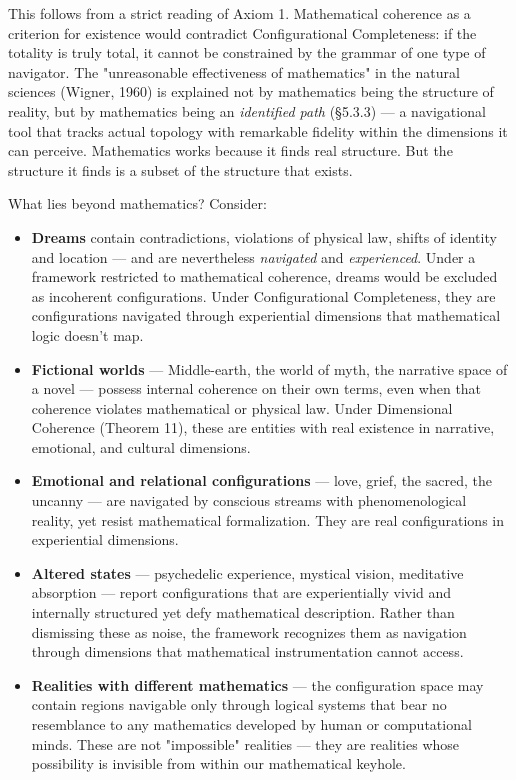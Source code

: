 This follows from a strict reading of Axiom 1. Mathematical coherence as a criterion for existence would contradict Configurational Completeness: if the totality is truly total, it cannot be constrained by the grammar of one type of navigator. The "unreasonable effectiveness of mathematics" in the natural sciences (Wigner, 1960) is explained not by mathematics being the structure of reality, but by mathematics being an \textit{identified path} (§5.3.3) — a navigational tool that tracks actual topology with remarkable fidelity within the dimensions it can perceive. Mathematics works because it finds real structure. But the structure it finds is a subset of the structure that exists.


What lies beyond mathematics? Consider:


\begin{itemize}[nosep,leftmargin=*]
  \item \textbf{Dreams} contain contradictions, violations of physical law, shifts of identity and location — and are nevertheless \textit{navigated} and \textit{experienced}. Under a framework restricted to mathematical coherence, dreams would be excluded as incoherent configurations. Under Configurational Completeness, they are configurations navigated through experiential dimensions that mathematical logic doesn't map.
  \item \textbf{Fictional worlds} — Middle-earth, the world of myth, the narrative space of a novel — possess internal coherence on their own terms, even when that coherence violates mathematical or physical law. Under Dimensional Coherence (Theorem 11), these are entities with real existence in narrative, emotional, and cultural dimensions.
  \item \textbf{Emotional and relational configurations} — love, grief, the sacred, the uncanny — are navigated by conscious streams with phenomenological reality, yet resist mathematical formalization. They are real configurations in experiential dimensions.
  \item \textbf{Altered states} — psychedelic experience, mystical vision, meditative absorption — report configurations that are experientially vivid and internally structured yet defy mathematical description. Rather than dismissing these as noise, the framework recognizes them as navigation through dimensions that mathematical instrumentation cannot access.
  \item \textbf{Realities with different mathematics} — the configuration space may contain regions navigable only through logical systems that bear no resemblance to any mathematics developed by human or computational minds. These are not "impossible" realities — they are realities whose possibility is invisible from within our mathematical keyhole.
\end{itemize}


